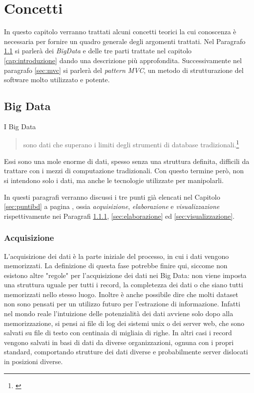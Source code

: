 \chapter{Concetti}%
In questo capitolo verranno trattati alcuni concetti teorici la cui conoscenza è necessaria per fornire un quadro generale degli argomenti trattati. Nel Paragrafo \ref{sec:bigdata} si parlerà dei \emph{BigData} e delle tre parti trattate nel capitolo~ \ref{cap:introduzione} dando una descrizione più approfondita. Successivamente nel paragrafo \ref{sec:mvc} si parlerà del \emph{pattern MVC}, un metodo di strutturazione del software molto utilizzato e potente.


\section{Big Data}\label{sec:bigdata}
I Big Data
\begin{quotation}
sono dati che superano i limiti degli strumenti di database tradizionali.\footnote{\cite{rezzani2013big}}
\end{quotation} 
Essi sono una mole enorme di dati, spesso senza una struttura definita, difficili da trattare con i mezzi di computazione tradizionali. Con questo termine però, non si intendono solo i dati, ma anche le tecnologie utilizzate per manipolarli.

In questi paragrafi verranno discussi i tre punti già elencati nel Capitolo \ref{sec:puntibd} a pagina \pageref{sec:puntibd}, ossia \emph{acquisizione}, \emph{elaborazione} e \emph{visualizzazione} rispettivamente nei Paragrafi \ref{sec:acquisizione}, \ref{sec:elaborazione} ed \ref{sec:visualizzazione}.


\subsection{Acquisizione}\label{sec:acquisizione}
L'acquisizione dei dati è la parte iniziale del processo, in cui i dati vengono memorizzati. La definizione di questa fase potrebbe finire qui, siccome non esistono altre "regole" per l'acquisizione dei dati nei Big Data: non viene imposta una struttura uguale per tutti i record, la completezza dei dati o che siano tutti memorizzati nello stesso luogo. Inoltre è anche possibile dire che molti dataset non sono pensati per un utilizzo futuro per l'estrazione di informazione. Infatti nel mondo reale l'intuizione delle potenzialità dei dati avviene solo dopo alla memorizzazione, si pensi ai file di log dei sistemi unix o dei server web, che sono salvati su file di testo con centinaia di migliaia di righe. In altri casi i record vengono salvati in basi di dati da diverse organizzazioni, ognuna con i propri standard, comportando strutture dei dati diverse e probabilmente server dislocati in posizioni diverse.

